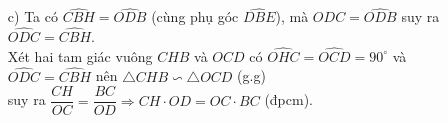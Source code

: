 \begin{ex}
{\begin{enumerate}
\item[c)] Ta có $\widehat{CBH}=\widehat{ODB}$ (cùng phụ góc $\widehat{DBE}$), mà $\widehat{ODC}=\widehat{ODB}$ suy ra $\widehat{ODC}=\widehat{CBH}$.\\
Xét hai tam giác vuông $CHB$ và $OCD$ có $\widehat{OHC}=\widehat{OCD}=90^\circ$ và $\widehat{ODC}=\widehat{CBH}$ nên 
$\triangle CHB \backsim \triangle OCD$ (g.g)\\
suy ra $\dfrac{CH}{OC}=\dfrac{BC}{OD} \Rightarrow CH\cdot OD=OC\cdot BC$ (đpcm).
\end{enumerate}
}
\end{ex}
